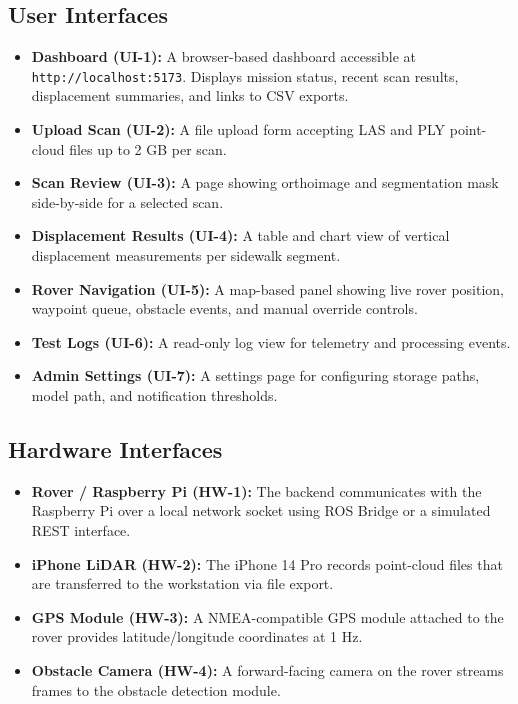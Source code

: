 \documentclass{article}
\begin{document}
\subsection{User Interfaces}
\begin{itemize}
  \item \textbf{Dashboard (UI-1):} A browser-based dashboard accessible at
    \texttt{http://localhost:5173}. Displays mission status, recent scan results, displacement
    summaries, and links to CSV exports.
  \item \textbf{Upload Scan (UI-2):} A file upload form accepting LAS and PLY point-cloud files
    up to 2 GB per scan.
  \item \textbf{Scan Review (UI-3):} A page showing orthoimage and segmentation mask
    side-by-side for a selected scan.
  \item \textbf{Displacement Results (UI-4):} A table and chart view of vertical displacement
    measurements per sidewalk segment.
  \item \textbf{Rover Navigation (UI-5):} A map-based panel showing live rover position,
    waypoint queue, obstacle events, and manual override controls.
  \item \textbf{Test Logs (UI-6):} A read-only log view for telemetry and processing events.
  \item \textbf{Admin Settings (UI-7):} A settings page for configuring storage paths, model
    path, and notification thresholds.
\end{itemize}

\subsection{Hardware Interfaces}
\begin{itemize}
  \item \textbf{Rover / Raspberry Pi (HW-1):} The backend communicates with the Raspberry Pi
    over a local network socket using ROS Bridge or a simulated REST interface.
  \item \textbf{iPhone LiDAR (HW-2):} The iPhone 14 Pro records point-cloud files that are
    transferred to the workstation via file export.
  \item \textbf{GPS Module (HW-3):} A NMEA-compatible GPS module attached to the rover provides
    latitude/longitude coordinates at 1 Hz.
  \item \textbf{Obstacle Camera (HW-4):} A forward-facing camera on the rover streams frames
    to the obstacle detection module.
\end{itemize}
\end{document}
